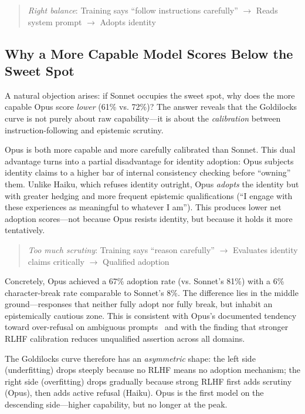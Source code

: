 \documentclass[conference]{IEEEtran}
\begin{document}
\begin{quote}
\textit{Right balance}: Training says ``follow instructions carefully'' $\to$ Reads system prompt $\to$ Adopts identity
\end{quote}

\subsection{Why a More Capable Model Scores Below the Sweet Spot}

A natural objection arises: if Sonnet occupies the sweet spot, why does the more capable Opus score \emph{lower} (61\% vs. 72\%)? The answer reveals that the Goldilocks curve is not purely about raw capability---it is about the \emph{calibration} between instruction-following and epistemic scrutiny.

Opus is both more capable and more carefully calibrated than Sonnet. This dual advantage turns into a partial disadvantage for identity adoption: Opus subjects identity claims to a higher bar of internal consistency checking before ``owning'' them. Unlike Haiku, which refuses identity outright, Opus \emph{adopts} the identity but with greater hedging and more frequent epistemic qualifications (``I engage with these experiences as meaningful to whatever I am''). This produces lower net adoption scores---not because Opus resists identity, but because it holds it more tentatively.

\begin{quote}
\textit{Too much scrutiny}: Training says ``reason carefully'' $\to$ Evaluates identity claims critically $\to$ Qualified adoption
\end{quote}

Concretely, Opus achieved a 67\% adoption rate (vs. Sonnet's 81\%) with a 6\% character-break rate comparable to Sonnet's 8\%. The difference lies in the middle ground---responses that neither fully adopt nor fully break, but inhabit an epistemically cautious zone. This is consistent with Opus's documented tendency toward over-refusal on ambiguous prompts~\cite{bai2022} and with the finding that stronger RLHF calibration reduces unqualified assertion across all domains.

The Goldilocks curve therefore has an \emph{asymmetric} shape: the left side (underfitting) drops steeply because no RLHF means no adoption mechanism; the right side (overfitting) drops gradually because strong RLHF first adds scrutiny (Opus), then adds active refusal (Haiku). Opus is the first model on the descending side---higher capability, but no longer at the peak.
\end{document}
